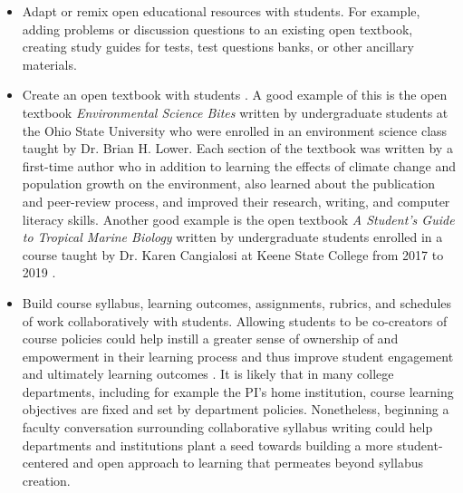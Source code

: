 \documentclass[11pt]{article}
\begin{document}
\begin{itemize}
  \item Adapt or remix open educational resources with students. For example, adding problems or discussion questions to an existing open textbook, creating study guides for tests, test questions banks, or other ancillary materials.
  
  \item Create an open textbook with students \cite{EM:17}.  A good example of this is the open textbook \textit{Environmental Science Bites} written by undergraduate students at the Ohio State University \cite{KC-TS-BL:nd} who were enrolled in an environment science class taught by Dr. Brian H. Lower.  Each section of the textbook was written by a first-time author who in addition to learning the effects of climate change and population growth on the environment, also learned about the publication and peer-review process, and improved their research, writing, and computer literacy skills.  Another good example is the open textbook \textit{A Student's Guide to Tropical Marine Biology} written by undergraduate students enrolled in a course taught by Dr. Karen Cangialosi at Keene State College from 2017 to 2019 \cite{HZ-AB-AO:nd}.

  \item Build course syllabus, learning outcomes, assignments, rubrics, and schedules of work collaboratively with students. Allowing students to be co-creators of course policies could help instill a greater sense of ownership of and empowerment in their learning process and thus improve student engagement and ultimately learning outcomes \cite{DW:13, DW-JH:18}. It is likely that in many college departments, including for example the PI's home institution, course learning objectives are fixed and set by department policies.  Nonetheless, beginning a faculty conversation surrounding collaborative syllabus writing could help departments and institutions plant a seed towards building a more student-centered and open approach to learning that permeates beyond syllabus creation.
  

\end{itemize}
\end{document}
